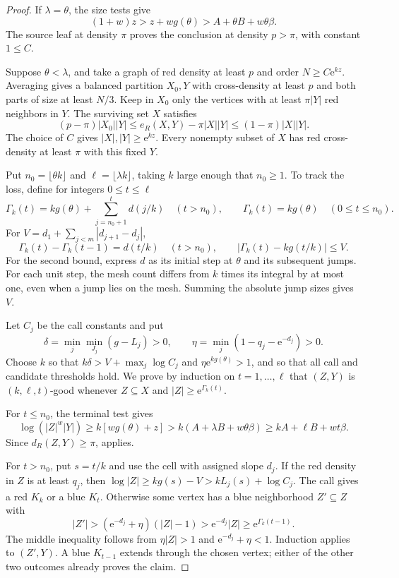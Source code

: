 \documentclass[11pt]{article}
\theoremstyle{definition}
\newcommand{\e}{\mathrm e}
\begin{document}
\begin{proof}
If $\lambda=\theta$, the size tests give
\[
 (1+w)z>z+wg(\theta)>A+\theta B+w\theta\beta.
\]
The source leaf at density $\pi$ proves the conclusion at density $p>\pi$, with constant $1\le C$.

Suppose $\theta<\lambda$, and take a graph of red density at least $p$ and order $N\ge C\e^{kz}$.
Averaging gives a balanced partition $X_0,Y$ with cross-density at least $p$ and both parts of size at least $N/3$.
Keep in $X_0$ only the vertices with at least $\pi|Y|$ red neighbors in $Y$.
The surviving set $X$ satisfies
\[
 (p-\pi)|X_0||Y|
 \le e_R(X,Y)-\pi|X||Y|
 \le(1-\pi)|X||Y|.
\]
The choice of $C$ gives $|X|,|Y|\ge\e^{kz}$.
Every nonempty subset of $X$ has red cross-density at least $\pi$ with this fixed $Y$.

Put $n_0=\lfloor\theta k\rfloor$ and $\ell=\lfloor\lambda k\rfloor$, taking $k$ large enough that $n_0\ge1$.
To track the loss, define for integers $0\le t\le\ell$
\[
 \Gamma_k(t)=kg(\theta)+\sum_{j=n_0+1}^{t}d(j/k)\quad(t>n_0),
 \qquad \Gamma_k(t)=kg(\theta)\quad(0\le t\le n_0).
\]
For $V=d_1+\sum_{j<m}|d_{j+1}-d_j|$,
\begin{equation}\label{eq:discrete}
 \Gamma_k(t)-\Gamma_k(t-1)=d(t/k)\quad(t>n_0),\qquad
 |\Gamma_k(t)-kg(t/k)|\le V.
\end{equation}
For the second bound, express $d$ as its initial step at $\theta$ and its subsequent jumps.
For each unit step, the mesh count differs from $k$ times its integral by at most one, even when a jump lies on the mesh.
Summing the absolute jump sizes gives $V$.

Let $C_j$ be the call constants and put
\[
 \delta=\min_j\min_{J_j}(g-L_j)>0,\qquad
 \eta=\min_j(1-q_j-\e^{-d_j})>0.
\]
Choose $k$ so that $k\delta>V+\max_j\log C_j$ and $\eta\e^{kg(\theta)}>1$, and so that all call and candidate thresholds hold.
We prove by induction on $t=1,\ldots,\ell$ that $(Z,Y)$ is $(k,\ell,t)$-good whenever $Z\subseteq X$ and $|Z|\ge\e^{\Gamma_k(t)}$.

For $t\le n_0$, the terminal test gives
\[
 \log(|Z|^w|Y|)\ge k[wg(\theta)+z]
 >k(A+\lambda B+w\theta\beta)
 \ge kA+\ell B+wt\beta.
\]
Since $d_R(Z,Y)\ge\pi$,  applies.

For $t>n_0$, put $s=t/k$ and use the cell with assigned slope $d_j$.
If the red density in $Z$ is at least $q_j$, then
$\log|Z|\ge kg(s)-V>kL_j(s)+\log C_j$.
The call gives a red $K_k$ or a blue $K_t$.
Otherwise some vertex has a blue neighborhood $Z'\subseteq Z$ with
\[
 |Z'|>(\e^{-d_j}+\eta)(|Z|-1)>\e^{-d_j}|Z|
 \ge\e^{\Gamma_k(t-1)}.
\]
The middle inequality follows from $\eta|Z|>1$ and $\e^{-d_j}+\eta<1$.
Induction applies to $(Z',Y)$.
A blue $K_{t-1}$ extends through the chosen vertex; either of the other two outcomes already proves the claim.


\end{proof}
\end{document}
